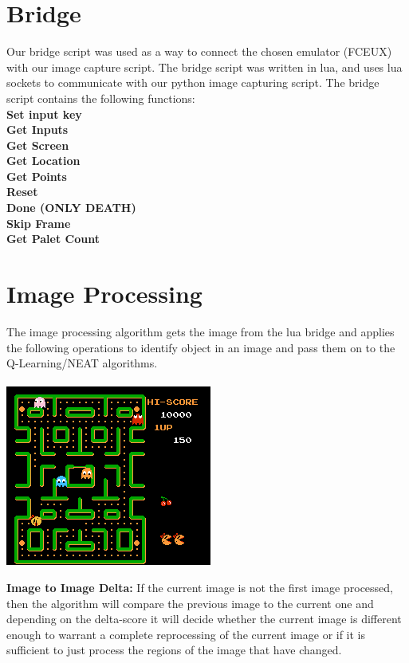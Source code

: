 \documentclass[12pt,journal,compsoc]{IEEEtran}
\begin{document}
\section{Bridge}
Our bridge script was used as a way to connect the chosen emulator (FCEUX) with our image capture script. The bridge script was written in lua, and uses lua sockets to communicate with our python image capturing script. The bridge script contains the following functions:\\
\textbf{Set input key}\\
\textbf{Get Inputs}\\
\textbf{Get Screen}\\
\textbf{Get Location}\\
\textbf{Get Points}\\
\textbf{Reset}\\
\textbf{Done (ONLY DEATH)}\\
\textbf{Skip Frame}\\
\textbf{Get Palet Count}

\section{Image Processing}
The image processing algorithm gets the image from the lua bridge and applies the following operations to identify object in an image and pass them on to the Q-Learning/NEAT algorithms.\\ \\
\includegraphics[scale=0.45]{frame626}

\textbf{Image to Image Delta:}
If the current image is not the first image processed, then the algorithm will compare the previous image to the current one and depending on the delta-score it will decide whether the current image is different enough to warrant a complete reprocessing of the current image or if it is sufficient to just process the regions of the image that have changed.
\end{document}
